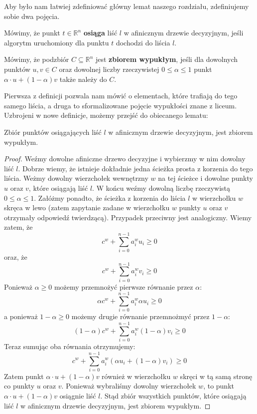 Aby było nam łatwiej zdefiniować główny lemat naszego rozdziału, zdefiniujemy sobie dwa pojęcia.
\begin{definition}
 Mówimy, że punkt $t \in \mathbb{R}^n$ \textbf{osiąga} liść $l$ w afinicznym drzewie decyzyjnym, jeśli algorytm uruchomiony dla punktu $t$ dochodzi do liścia $l$.
\end{definition}
\begin{definition}
 Mówimy, że podzbiór $C \subseteq \mathbb{R}^n$ jest \textbf{zbiorem wypukłym}, jeśli dla dowolnych punktów $u, v \in C$ oraz dowolnej liczby rzeczywistej $0 \leq \alpha \leq 1$ punkt $\alpha \cdot u + (1 - \alpha) v$ także należy do $C$.
\end{definition}
Pierwsza z definicji pozwala nam mówić o elementach, które trafiają do tego samego liścia, a druga to sformalizowane pojęcie wypukłości znane z liceum.
Uzbrojeni w nowe definicje, możemy przejść do obiecanego lematu:

\begin{lemma}
 Zbiór punktów osiągających liść $l$ w afinicznym drzewie decyzyjnym, jest zbiorem wypukłym.
 \label{uniqness-lemma}
\end{lemma}

\begin{proof}
 Weźmy dowolne afiniczne drzewo decyzyjne i wybierzmy w nim dowolny liść $l$.
 Dobrze wiemy, że istnieje dokładnie jedna ścieżka prosta z korzenia do tego liścia.
 Weżmy dowolny wierzchołek wewnętrzny $w$ na tej ścieżce i dowolne punkty $u$ oraz $v$, które osiągają liść $l$.
 W końcu weźmy dowolną liczbę rzeczywistą $0 \leq \alpha \leq 1$.
 Załóżmy ponadto, że ścieżka z korzenia do liścia $l$ w wierzchołku $w$ skręca w lewo (zatem zapytanie zadane w wierzchołku $w$ punkty $u$ oraz $v$ otrzymały odpowiedź twierdzącą).
 Przypadek przeciwny jest analogiczny.
 Wiemy zatem, że
\[
 c^w + \sum_{i=0}^{n-1} a_i^w u_i \geq 0
\]
 oraz, że
\[
 c^w + \sum_{i=0}^{n-1} a_i^w v_i \geq 0
\]
 Ponieważ $\alpha \geq 0$ możemy przemnożyć pierwsze równanie przez $\alpha$:
\[
 \alpha c^w + \sum_{i=0}^{n-1} a_i^w \alpha u_i \geq 0
\]
 a ponieważ $1 - \alpha \geq 0$ możemy drugie równanie przemnożmyć przez $1 - \alpha$:
\[
 (1 - \alpha) c^w + \sum_{i=0}^{n-1} a_i^w (1 - \alpha) v_i \geq 0
\]
Teraz sumując oba równania otrzymujemy:
\[
 c^w + \sum_{i=0}^{n-1} a_i^w (\alpha u_i + (1 - \alpha) v_i) \geq 0
\]
Zatem punkt $\alpha \cdot u + (1 - \alpha) v$ również w wierzchołku $w$ skręci w tą samą stronę co punkty $u$ oraz $v$.
Ponieważ wybraliśmy dowolny wierzchołek $w$, to punkt $\alpha \cdot u + (1 - \alpha) v$ osiągnie liść $l$.
Stąd zbiór wszystkich punktów, które osiągają liść $l$ w afinicznym drzewie decyzyjnym, jest zbiorem wypukłym.
\end{proof}

